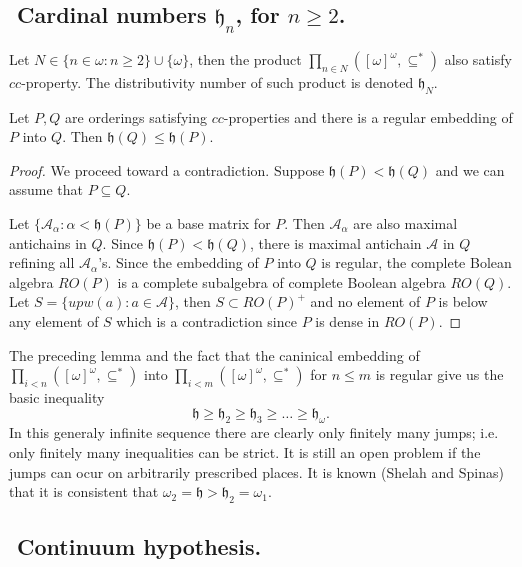 \subsection{${}$ Cardinal numbers $\mathfrak h_n$, for $n \geq 2$.}

Let $N \in \{n \in \omega: n \geq 2\} \cup \{ \omega \}$, then the
product $\prod_{n \in N} ([\omega]^\omega,\subseteq^*)$ also satisfy
$cc$-property. The distributivity number of such product is denoted
$\mathfrak h_N$.

\begin{lemma}
 Let $P,Q$ are orderings satisfying $cc$-properties and there is a regular
embedding of $P$ into $Q$. Then $\mathfrak h(Q) \leq \mathfrak h(P)$.
\end{lemma}

\begin{proof}
 We proceed toward a contradiction. Suppose $\mathfrak h(P) < \mathfrak h(Q)$
and we can assume that $P \subseteq Q$.

Let $\{\mathcal A_\alpha : \alpha < \mathfrak h(P) \}$ be a base matrix for $P$.
Then $\mathcal A_\alpha$ are also maximal antichains in $Q$. Since
$\mathfrak h(P) < \mathfrak h(Q)$, there is maximal antichain $\mathcal A$ in $Q$
refining all $\mathcal A_\alpha$'s. Since the embedding of $P$ into $Q$ is
regular, the complete Bolean algebra $RO(P)$ is a complete subalgebra
of complete Boolean algebra $RO(Q)$. Let $S = \{ upw(a) : a \in \mathcal A \}$,
then $S \subset RO(P)^+$ and no element of $P$
is below any element of $S$ which is a contradiction since $P$ is dense in $RO(P)$.
\end{proof}

The preceding lemma and the fact that the caninical embedding
of $\prod_{i < n} ([\omega]^\omega,\subseteq^*)$ into $\prod_{i < m} ([\omega]^\omega,\subseteq^*)$
for $n \leq m$ is regular give us the basic inequality
$$
\mathfrak h \geq \mathfrak h_2 \geq \mathfrak h_3 \geq \dots \geq \mathfrak h_\omega.
$$
In this generaly infinite sequence there are clearly only finitely many jumps; i.e.
only finitely many inequalities can be strict. It is still an open problem if the
jumps can ocur on arbitrarily prescribed places. It is known (Shelah and Spinas)
that it is consistent that $\omega_2 = \mathfrak h > \mathfrak h_2 = \omega_1$.


\subsection{${}$ Continuum hypothesis.}


